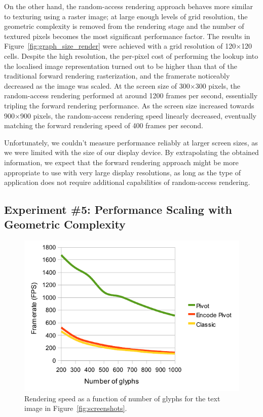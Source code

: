 \documentclass[11pt,a4paper,twoside]{article}
\begin{document}
On the other hand, the random-access rendering approach behaves more similar to texturing using a raster image; at large enough levels of grid resolution, the geometric complexity is removed from the rendering stage and the number of textured pixels becomes the most significant performance factor. The results in Figure~\ref{fig:graph_size_render} were achieved with a grid resolution of 120$\times$120 cells. Despite the high resolution, the per-pixel cost of performing the lookup into the localised image representation turned out to be higher than that of the traditional forward rendering rasterization, and the framerate noticeably decreased as the image was scaled. At the screen size of 300$\times$300 pixels, the random-access rendering performed at around 1200 frames per second, essentially tripling the forward rendering performance. As the screen size increased towards 900$\times$900 pixels, the random-access rendering speed linearly decreased, eventually matching the forward rendering speed of 400 frames per second.

Unfortunately, we couldn't measure performance reliably at larger screen sizes, as we were limited with the size of our display device. By extrapolating the obtained information, we expect that the forward rendering approach might be more appropriate to use with very large display resolutions, as long as the type of application does not require additional capabilities of random-access rendering.

\subsection {Experiment \#5: Performance Scaling with Geometric Complexity}

\begin {figure} [h]
	\centering
	\includegraphics[width=0.6\columnwidth] {figures/graph_glyphs_render}
	\caption {Rendering speed as a function of number of glyphs for the text image in Figure~\ref{fig:screenshots}.}
	\label {fig:graph_glyphs_render}
\end {figure}
\end{document}

